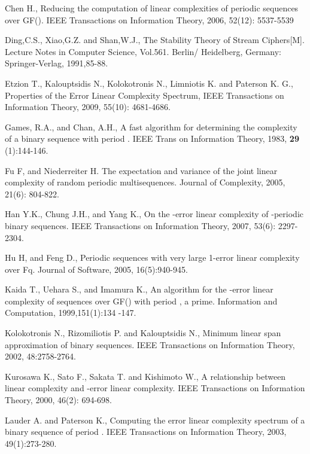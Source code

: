 \documentclass[10pt,conference,twocolumn]{IEEEtran}
\begin{document}
\begin{thebibliography}{3}

Chen H., Reducing the computation of linear complexities of periodic
sequences over GF(). IEEE Transactions on Information Theory,
2006, 52(12): 5537-5539


 Ding,C.S.,  Xiao,G.Z.  and Shan,W.J., The Stability Theory of Stream
Ciphers[M]. Lecture Notes in Computer Science, Vol.561. Berlin/
Heidelberg, Germany: Springer-Verlag, 1991,85-88.

Etzion T., Kalouptsidis N., Kolokotronis N., Limniotis K. and
Paterson K. G., Properties of the Error Linear Complexity Spectrum,
IEEE Transactions on Information Theory, 2009, 55(10): 4681-4686.

Games, R.A., and Chan, A.H., A fast algorithm for determining the
complexity of a binary sequence with period . IEEE Trans on
Information Theory, 1983, {\bf29} (1):144-146.

Fu F, and Niederreiter H. The expectation and variance of the joint
linear complexity of random periodic multisequences. Journal of
Complexity, 2005, 21(6): 804-822.

Han Y.K., Chung J.H., and Yang K., On the -error linear
complexity of -periodic binary sequences. IEEE Transactions on
Information Theory, 2007, 53(6): 2297-2304.

Hu H, and Feng D., Periodic sequences with very large 1-error linear
complexity over Fq. Journal of Software, 2005, 16(5):940-945.

Kaida T., Uehara S., and Imamura K., An algorithm for the -error
linear complexity of sequences over GF() with period , 
a prime. Information and Computation, 1999,151(1):134 -147.

Kolokotronis N., Rizomiliotis P. and Kalouptsidis N., Minimum linear
span approximation of binary sequences. IEEE Transactions on
Information Theory, 2002, 48:2758-2764.

Kurosawa K., Sato F., Sakata T. and Kishimoto W., A relationship
between linear complexity and -error linear complexity. IEEE
Transactions on Information Theory, 2000, 46(2): 694-698.


Lauder A. and Paterson K., Computing the error linear complexity
spectrum of a binary sequence of period . IEEE Transactions on
Information Theory, 2003, 49(1):273-280.



\end{thebibliography}
\end{document}
